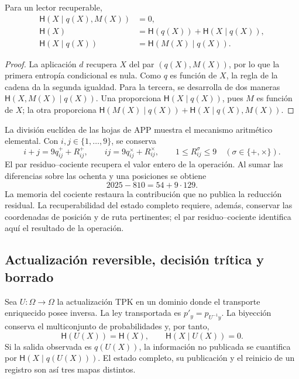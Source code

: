 \begin{proposition}
Para un lector recuperable,
\begin{align}
 \mathsf H(X\mid q(X),M(X))&=0,\\
 \mathsf H(X)&=\mathsf H(q(X))+\mathsf H(X\mid q(X)),\\
 \mathsf H(X\mid q(X))&=\mathsf H(M(X)\mid q(X)).
 \label{v:ant:eq:ii-kb-aut-fibra}
\end{align}
\end{proposition}
\begin{proof}
La aplicación \(d\) recupera \(X\) del par \((q(X),M(X))\),
por lo que la primera entropía condicional es nula. Como \(q\) es
función de \(X\), la regla de la cadena da la segunda igualdad.
Para la tercera, se desarrolla de dos maneras
\(\mathsf H(X,M(X)\mid q(X))\). Una proporciona
\(\mathsf H(X\mid q(X))\), pues \(M\) es función de \(X\);
la otra proporciona
\(\mathsf H(M(X)\mid q(X))+\mathsf H(X\mid q(X),M(X))\).
\end{proof}

La división euclídea de las hojas de APP muestra el mecanismo
aritmético elemental. Con \(i,j\in\{1,\ldots,9\}\), se conserva
\[
 i+j=9q^+_{ij}+R^+_{ij},\qquad
 ij=9q^\times_{ij}+R^\times_{ij},\qquad
 1\leq R^\sigma_{ij}\leq9\quad(\sigma\in\{+,\times\}).
\]
El par residuo--cociente recupera el valor entero de la operación.
Al sumar las diferencias sobre las ochenta y una posiciones se obtiene
\[
 2025-810=54+9\cdot129.
\]
La memoria del cociente restaura la contribución que no publica la
reducción residual. La recuperabilidad del estado completo requiere,
además, conservar las coordenadas de posición y de ruta pertinentes;
el par residuo--cociente identifica aquí el resultado de la operación.

\subsection{Actualización reversible, decisión trítica y borrado}

Sea \(U:\Omega\to\Omega\) la actualización TPK en un dominio donde
el transporte enriquecido posee inversa. La ley transportada es
\(p'_y=p_{U^{-1}y}\). La biyección conserva el multiconjunto de
probabilidades y, por tanto,
\begin{equation}
 \mathsf H(U(X))=\mathsf H(X),\qquad
 \mathsf H(X\mid U(X))=0.
 \label{v:ant:eq:ii-kb-aut-reversible}
\end{equation}
Si la salida observada es \(q(U(X))\), la información no publicada
se cuantifica por \(\mathsf H(X\mid q(U(X)))\). El estado completo,
su publicación y el reinicio de un registro son así tres mapas distintos.

